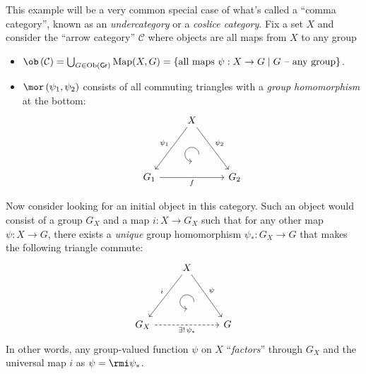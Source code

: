 \begin{example}
This example will be a very common special case of what's called a ``comma category'', known as an \emph{undercategory} or a \emph{coslice category}. Fix a set $X$ and consider the ``arrow category'' $\mathcal{C}$
where objects are all maps from $X$ to any group
\begin{itemize}
\item $\ob\left(\mathcal{C}\right)=\bigcup_{G\in\mathrm{Ob}(\mathsf{Gr})}\mathrm{Map}(X,G)=\left\{ \text{all maps }\psi:X\to G\mid G\text{ -- any group}\right\}$.
\item $\mor\left(\psi_{1},\psi_{2}\right)$ consists of all commuting triangles
with a \emph{group homomorphism} at the bottom:
\[\begin{tikzcd}[every matrix/.append style={name=m},   
execute at end picture={\draw [<-] ([xshift=0mm,yshift=-6mm]m-2-2.north) arc[start angle=-90,delta angle=-270,radius=0.25cm];}]
   & X\arrow[ddl,swap,"\psi_1" ]\arrow[ddr,"\psi_2"] & \\
   & \, & \\
   G_1 \arrow[rr,swap,"f"]& & G_2
\end{tikzcd}\]
\end{itemize}
Now consider looking for an initial object in this category. Such
an object would consist of a group $G_{X}$ and a map $i:X\to G_{X}$
such that for any other map $\psi:X\to G$, there exists a \emph{unique}
group homomorphism $\psi_{\ast}:G_{X}\to G$ that makes the following
triangle commute:\[\begin{tikzcd}[every matrix/.append style={name=m},   
execute at end picture={\draw [<-] ([xshift=0mm,yshift=-6mm]m-2-2.north) arc[start angle=-90,delta angle=-270,radius=0.25cm];}]
   & X\arrow[ddl,swap,"i" ]\arrow[ddr,"\psi"] & \\
   & \, & \\
   G_X \arrow[rr,dashed,swap,"\exists!\,\psi_\ast"]& & G
\end{tikzcd}\]In other words, any group-valued function $\psi$ on $X$ ``\emph{factors}''
through $G_{X}$ and the universal map $i$ as $\psi=\rmi\psi_{\ast}$.


\end{example}

